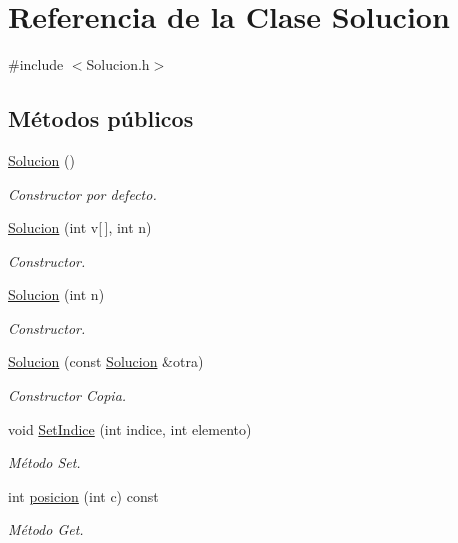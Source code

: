 \hypertarget{class_solucion}{}\section{Referencia de la Clase Solucion}
\label{class_solucion}


{\ttfamily \#include $<$Solucion.\+h$>$}

\subsection*{Métodos públicos}
\begin{DoxyCompactItemize}
\item 
\hyperlink{class_solucion_aee1f8f6ec9caf3886f7e4a23b1084966}{Solucion} ()
\begin{DoxyCompactList}\small\item\em Constructor por defecto. \end{DoxyCompactList}\item 
\hyperlink{class_solucion_acd917e47259aee67810ec38a37709123}{Solucion} (int v\mbox{[}$\,$\mbox{]}, int n)
\begin{DoxyCompactList}\small\item\em Constructor. \end{DoxyCompactList}\item 
\hyperlink{class_solucion_a6e3225367ac4bf17e34b778553e0c574}{Solucion} (int n)
\begin{DoxyCompactList}\small\item\em Constructor. \end{DoxyCompactList}\item 
\hyperlink{class_solucion_ae91a9a5271288614bf6028f316d45144}{Solucion} (const \hyperlink{class_solucion}{Solucion} \&otra)
\begin{DoxyCompactList}\small\item\em Constructor Copia. \end{DoxyCompactList}\item 
void \hyperlink{class_solucion_a1827270a149184c626cd7627ef80a1be}{Set\+Indice} (int indice, int elemento)
\begin{DoxyCompactList}\small\item\em Método Set. \end{DoxyCompactList}\item 
int \hyperlink{class_solucion_a1fbc35b09567a9f40c986e6d0d76342b}{posicion} (int c) const 
\begin{DoxyCompactList}\small\item\em Método Get. \end{DoxyCompactList}\item 

\end{DoxyCompactItemize}
